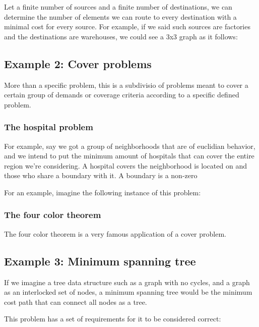 \documentclass{textbook}
\begin{document}
Let a finite number of sources and a finite number of destinations, we can determine the
number of elements we can route to every destination with a minimal cost for every source. 
For example, if we said such sources are factories and the destinations are warehouses, we could see a 3x3
graph as it follows:


\subsection{Example 2: Cover problems}

More than a specific problem, this is a subdivisio of problems meant to cover a certain group of demands
or coverage criteria according to a specific defined problem.

\subsubsection{The hospital problem}

For example, say we got a group of neighborhoods that are of euclidian behavior, and we intend to put the minimum amount of
hospitals that can cover the entire region we're considering. A hospital covers the neighborhood is located on and
those who share a boundary with it. A boundary is a non-zero

For an example, imagine the following instance of this problem:


\subsubsection{The four color theorem}

The four color theorem is a very famous application of a cover problem. 


\subsection{Example 3: Minimum spanning tree}

If we imagine a tree data structure such as a graph with no cycles, and a graph as an interlocked set of
nodes, a minimum spanning tree would be the minimum cost path that can connect all nodes as a tree.

This problem has a set of requirements for it to be considered correct:
\end{document}
